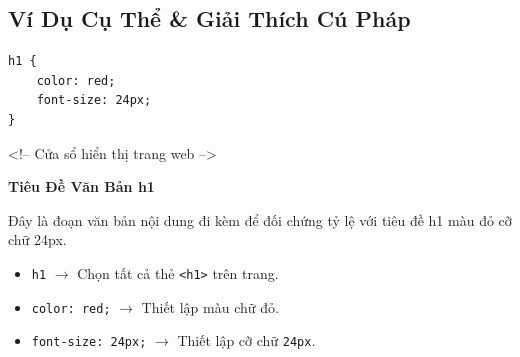 \documentclass[11pt,oneside]{book}
\newcommand{\codeinline}[1]{\textcolor{accentOrange}{\texttt{#1}}}
\begin{document}
\subsection{Ví Dụ Cụ Thể \& Giải Thích Cú Pháp}
\begin{codeWindow}
\begin{lstlisting}[language=CSS3]
h1 {
    color: red;
    font-size: 24px;
}
\end{lstlisting}
\end{codeWindow}

\begin{browserWindow}
\sffamily\small
\begin{tcolorbox}[enhanced, colback=white, colframe=primaryBlue!20, arc=6pt, boxrule=0.8pt, top=10pt, bottom=10pt, left=14pt, right=14pt]
  \textcolor{gray!45}{\scriptsize\ttfamily <!-- Cửa sổ hiển thị trang web -->}\par\vspace{4pt}
  {\fontsize{24pt}{28pt}\selectfont\bfseries\color{red!80!black} Tiêu Đề Văn Bản h1}\par\vspace{6pt}
  \textcolor{darkText!75}{\small Đây là đoạn văn bản nội dung đi kèm để đối chứng tỷ lệ với tiêu đề h1 màu đỏ cỡ chữ 24px.}
  \par\vspace{6pt}
\end{tcolorbox}
\end{browserWindow}

\begin{noteBox}
\begin{itemize}[leftmargin=1.5em, itemsep=2pt, parsep=0pt]
    \item \codeinline{h1} $\rightarrow$ Chọn tất cả thẻ \codeinline{<h1>} trên trang.
    \item \codeinline{color: red;} $\rightarrow$ Thiết lập màu chữ đỏ.
    \item \codeinline{font-size: 24px;} $\rightarrow$ Thiết lập cỡ chữ \codeinline{24px}.
\end{itemize}
\end{noteBox}

\end{document}
